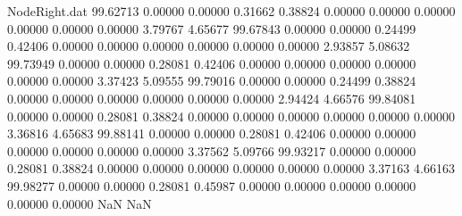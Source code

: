 \begin{filecontents}{NodeRight.dat}
  99.62713    0.00000    0.00000     0.31662    0.38824    0.00000    0.00000    0.00000    0.00000    0.00000    0.00000    3.79767    4.65677
  99.67843    0.00000    0.00000     0.24499    0.42406    0.00000    0.00000    0.00000    0.00000    0.00000    0.00000    2.93857    5.08632
  99.73949    0.00000    0.00000     0.28081    0.42406    0.00000    0.00000    0.00000    0.00000    0.00000    0.00000    3.37423    5.09555
  99.79016    0.00000    0.00000     0.24499    0.38824    0.00000    0.00000    0.00000    0.00000    0.00000    0.00000    2.94424    4.66576
  99.84081    0.00000    0.00000     0.28081    0.38824    0.00000    0.00000    0.00000    0.00000    0.00000    0.00000    3.36816    4.65683
  99.88141    0.00000    0.00000     0.28081    0.42406    0.00000    0.00000    0.00000    0.00000    0.00000    0.00000    3.37562    5.09766
  99.93217    0.00000    0.00000     0.28081    0.38824    0.00000    0.00000    0.00000    0.00000    0.00000    0.00000    3.37163    4.66163
  99.98277    0.00000    0.00000     0.28081    0.45987    0.00000    0.00000    0.00000    0.00000    0.00000    0.00000        NaN        NaN
\end{filecontents}
